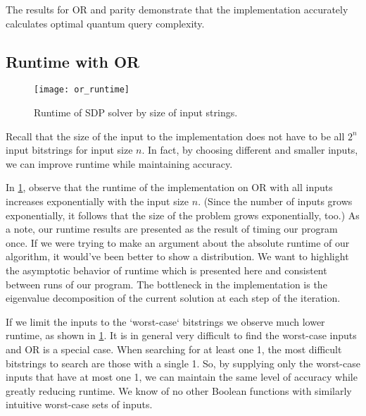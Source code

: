 The results for OR and parity demonstrate
that the implementation accurately calculates
optimal quantum query complexity.

\subsection{Runtime with OR}

\begin{figure}[H]
\centering
\texttt{[image: or\_runtime]}
\caption{Runtime of SDP solver by size of input strings.}
\label{fig:or_runtime}
\end{figure}

Recall that the size of the input to the implementation
does not have to be all $2^n$ input bitstrings
for input size $n$. In fact,
by choosing different and smaller inputs,
we can improve runtime while maintaining accuracy.

In \cref{fig:or_runtime}, observe that the
runtime of the implementation on OR with all
inputs increases exponentially
with the input size $n$.
(Since the number of inputs grows exponentially,
it follows that the size of the problem grows
exponentially, too.) As a note, our
runtime results are presented as the
result of timing our program once. If we
were trying to make an argument about the
absolute runtime of our algorithm, it
would've been better to show a
distribution. We want to highlight the
asymptotic behavior of runtime which is
presented here and consistent between
runs of our program.
The bottleneck in the implementation is
the eigenvalue decomposition of the current
solution at each step of the iteration.


If we limit the inputs to the `worst-case`
bitstrings we observe much lower runtime, as shown in \ref{fig:or_runtime}.
It is in general very difficult to find the worst-case
inputs and OR is a special case.
When searching for at least one 1, the most
difficult bitstrings to search are those with a single 1.
So, by supplying only the worst-case inputs that
have at most one 1, we can maintain the same level of accuracy while
greatly reducing runtime.
We know of no other Boolean functions with
similarly intuitive worst-case sets of inputs.
